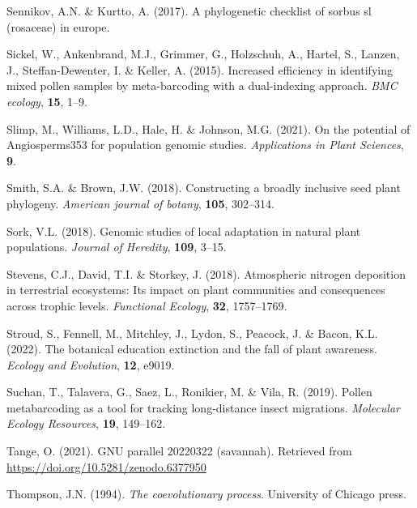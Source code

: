 \documentclass[
]{article}
\newlength{\cslhangindent}
\newlength{\cslentryspacingunit} %
\newenvironment{CSLReferences}[2] %
 {%
  \setlength{\parindent}{0pt}
  \ifodd #1
  \let\oldpar\par
  \def\par{\hangindent=\cslhangindent\oldpar}
  \fi
  \setlength{\parskip}{#2\cslentryspacingunit}
 }%
 {}
\begin{document}
\begin{CSLReferences}{1}{0}
\leavevmode{}%
Sennikov, A.N. \& Kurtto, A. (2017). A phylogenetic checklist of sorbus
sl (rosaceae) in europe.

\leavevmode{}%
Sickel, W., Ankenbrand, M.J., Grimmer, G., Holzschuh, A., Hartel, S.,
Lanzen, J., Steffan-Dewenter, I. \& Keller, A. (2015). Increased
efficiency in identifying mixed pollen samples by meta-barcoding with a
dual-indexing approach. \emph{BMC ecology}, \textbf{15}, 1--9.

\leavevmode{}%
Slimp, M., Williams, L.D., Hale, H. \& Johnson, M.G. (2021). On the
potential of Angiosperms353 for population genomic studies.
\emph{Applications in Plant Sciences}, \textbf{9}.

\leavevmode{}%
Smith, S.A. \& Brown, J.W. (2018). Constructing a broadly inclusive seed
plant phylogeny. \emph{American journal of botany}, \textbf{105},
302--314.

\leavevmode{}%
Sork, V.L. (2018). Genomic studies of local adaptation in natural plant
populations. \emph{Journal of Heredity}, \textbf{109}, 3--15.

\leavevmode{}%
Stevens, C.J., David, T.I. \& Storkey, J. (2018). Atmospheric nitrogen
deposition in terrestrial ecosystems: Its impact on plant communities
and consequences across trophic levels. \emph{Functional Ecology},
\textbf{32}, 1757--1769.

\leavevmode{}%
Stroud, S., Fennell, M., Mitchley, J., Lydon, S., Peacock, J. \& Bacon,
K.L. (2022). The botanical education extinction and the fall of plant
awareness. \emph{Ecology and Evolution}, \textbf{12}, e9019.

\leavevmode{}%
Suchan, T., Talavera, G., Saez, L., Ronikier, M. \& Vila, R. (2019).
Pollen metabarcoding as a tool for tracking long-distance insect
migrations. \emph{Molecular Ecology Resources}, \textbf{19}, 149--162.

\leavevmode{}%
Tange, O. (2021). GNU parallel 20220322 (savannah). Retrieved from
\url{https://doi.org/10.5281/zenodo.6377950}

\leavevmode{}%
Thompson, J.N. (1994). \emph{The coevolutionary process}. University of
Chicago press.


\end{CSLReferences}
\end{document}
